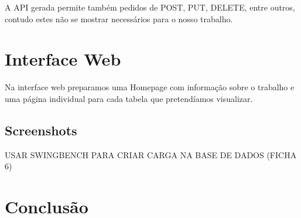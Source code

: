 \documentclass[a4paper]{article}
\begin{document}
A API gerada permite também pedidos de POST, PUT, DELETE, entre outros, contudo estes não se mostrar necessários para o nosso trabalho.


\section{Interface Web}
\hspace{3mm} 

Na interface web preparamos uma Homepage com informação sobre o trabalho e uma página individual para cada tabela que pretendíamos visualizar.



\subsection{Screenshots}
\hspace{3mm} 
USAR SWINGBENCH PARA CRIAR CARGA NA BASE DE DADOS (FICHA 6)




\newpage
\section{Conclusão}
\hspace{3mm} 
\end{document}
